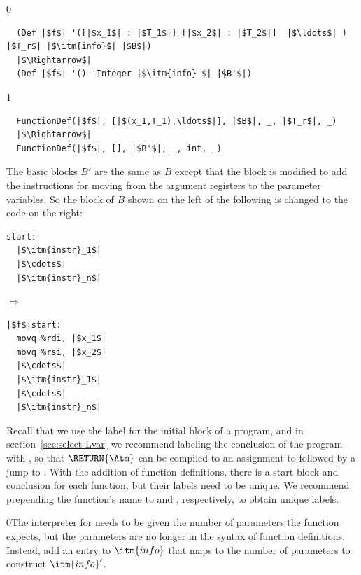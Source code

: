 \documentclass[7x10]{TimesAPriori_MIT}%
\def\racketEd{0}
\def\pythonEd{1}
\providecommand{\BookEdition}{1}
\let\edition\BookEdition
\newcommand{\racket}[1]{{\if\edition\racketEd{#1}\fi}}
\newcommand{\pythonColor}[0]{}
\numberwithin{theorem}{chapter}
\numberwithin{definition}{chapter}
\numberwithin{equation}{chapter}
\begin{document}
{\if\edition\racketEd
\begin{lstlisting}
  (Def |$f$| '([|$x_1$| : |$T_1$|] [|$x_2$| : |$T_2$|]  |$\ldots$| ) |$T_r$| |$\itm{info}$| |$B$|)
  |$\Rightarrow$|
  (Def |$f$| '() 'Integer |$\itm{info}'$| |$B'$|)
\end{lstlisting}
\fi}
{\if\edition\pythonEd\pythonColor
\begin{lstlisting}
  FunctionDef(|$f$|, [|$(x_1,T_1),\ldots$|], |$B$|, _, |$T_r$|, _)
  |$\Rightarrow$|
  FunctionDef(|$f$|, [], |$B'$|, _, int, _)
\end{lstlisting}
\fi}
The basic blocks $B'$ are the same as $B$ except that the
 block is modified to add the instructions for moving from
the argument registers to the parameter variables. So the 
block of $B$ shown on the left of the following is changed to the code
on the right:
\begin{center}
\begin{minipage}{0.3\textwidth}
\begin{lstlisting}
start:
  |$\itm{instr}_1$|
  |$\cdots$|
  |$\itm{instr}_n$|
\end{lstlisting}
\end{minipage}
$\Rightarrow$
\begin{minipage}{0.3\textwidth}
\begin{lstlisting}
|$f$|start:
  movq %rdi, |$x_1$|
  movq %rsi, |$x_2$|
  |$\cdots$|
  |$\itm{instr}_1$|
  |$\cdots$|
  |$\itm{instr}_n$|
\end{lstlisting}
\end{minipage}
\end{center}
Recall that we use the label  for the initial block of a
program, and in section~\ref{sec:select-Lvar} we recommend labeling
the conclusion of the program with , so that
$\RETURN{\Atm}$ can be compiled to an assignment to  followed
by a jump to . With the addition of function
definitions, there is a start block and conclusion for each function,
but their labels need to be unique. We recommend prepending the
function's name to  and , respectively,
to obtain unique labels.

\racket{The interpreter for \LangXIndCall{} needs to be given the
  number of parameters the function expects, but the parameters are no
  longer in the syntax of function definitions. Instead, add an entry
  to $\itm{info}$ that maps \code{num-params} to the number of
  parameters to construct $\itm{info}'$.}
\end{document}
